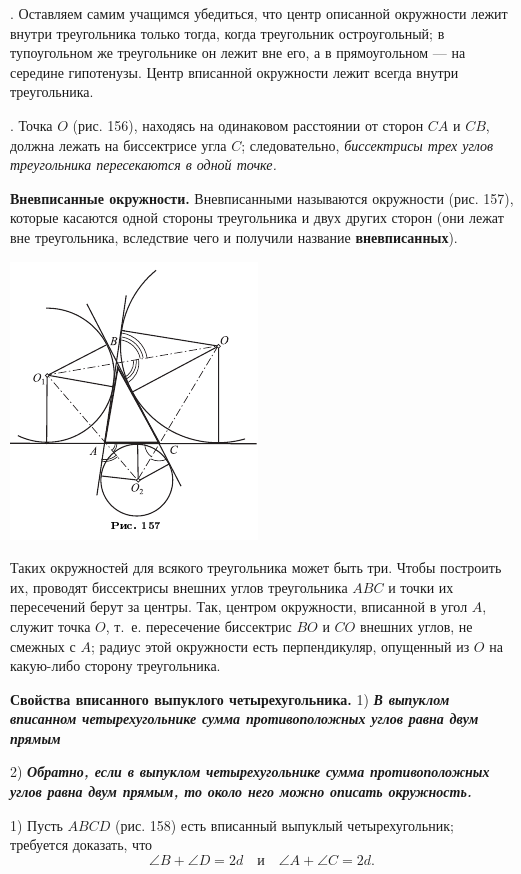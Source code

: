 \documentclass[oneside]{book}
\begin{document}
.
Оставляем самим учащимся убедиться, что центр описанной окружности лежит внутри треугольника только тогда, когда треугольник остроугольный;
в тупоугольном же треугольнике он лежит вне его, а в прямоугольном — на середине гипотенузы.
Центр вписанной окружности лежит всегда внутри треугольника.

.
Точка $O$ (рис. 156), находясь на одинаковом расстоянии от сторон $CA$ и $CB$, должна лежать на биссектрисе угла $C$;
следовательно, \emph{биссектрисы трех углов треугольника пересекаются в одной точке.}

\textbf{Вневписанные окружности.}
Вневписанными называются окружности (рис. 157), которые касаются одной стороны треугольника и  двух других сторон (они лежат вне треугольника, вследствие чего и получили название \textbf{вневписанных}).

\includegraphics{pics/ris-157}

Таких окружностей для всякого треугольника может быть три.
Чтобы построить их, проводят биссектрисы внешних углов треугольника $ABC$ и точки их пересечений берут за центры.
Так, центром окружности, вписанной в угол $A$, служит точка $O$, т.~е.
пересечение биссектрис $BO$ и $CO$ внешних углов, не смежных с $A$;
радиус этой окружности есть перпендикуляр, опущенный из $O$ на какую-либо сторону треугольника.

\textbf{Свойства вписанного выпуклого четырехугольника.}
1) \textbf{\emph{В выпуклом вписанном четырехугольнике сумма противоположных углов равна двум прямым}}

2) \textbf{\emph{Обратно, если в выпуклом четырехугольнике сумма противоположных углов равна двум прямым, то около него можно описать окружность.}}

1) Пусть $ABCD$ (рис. 158) есть вписанный выпуклый четырехугольник;
требуется доказать, что
\[\angle B+\angle D = 2d\quad\text{и}\quad \angle A + \angle C = 2d.\]
\end{document}
